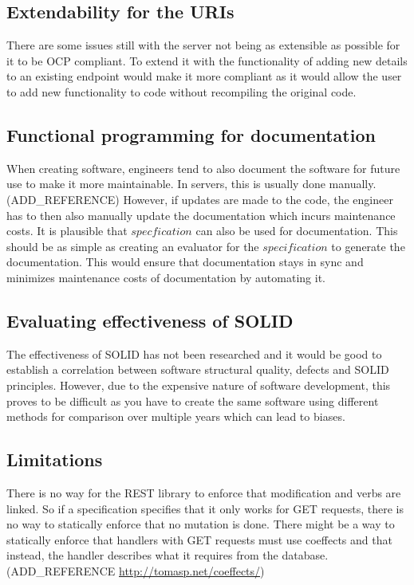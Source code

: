 \subsection{Extendability for the URIs}

There are some issues still with the server not being as extensible as possible
for it to be OCP compliant. To extend it with the functionality of adding new
details to an existing endpoint would make it more compliant as it would allow
the user to add new functionality to code without recompiling the original
code. 

\subsection{Functional programming for documentation}

When creating software, engineers tend to also document the software for future
use to make it more maintainable. In servers, this is usually done manually.
(ADD\_REFERENCE) However, if updates are made to the code, the engineer has to
then also manually update the documentation which incurs maintenance costs. It
is plausible that $specfication$ can also be used for documentation. This
should be as simple as creating an evaluator for the $specification$ to
generate the documentation. This would ensure that documentation stays in sync
and minimizes maintenance costs of documentation by automating it.

\subsection{Evaluating effectiveness of SOLID}

The effectiveness of SOLID has not been researched and it would be good to
establish a correlation between software structural quality, defects and SOLID
principles. However, due to the expensive nature of software development, this
proves to be difficult as you have to create the same software using different
methods for comparison over multiple years which can lead to biases.

\subsection{Limitations}

There is no way for the REST library to enforce that modification and verbs are
linked. So if a specification specifies that it only works for GET requests,
there is no way to statically enforce that no mutation is done. There might be a
way to statically enforce that handlers with GET requests must use coeffects and
that instead, the handler describes what it requires from the
database.(ADD\_REFERENCE \url{http://tomasp.net/coeffects/})


